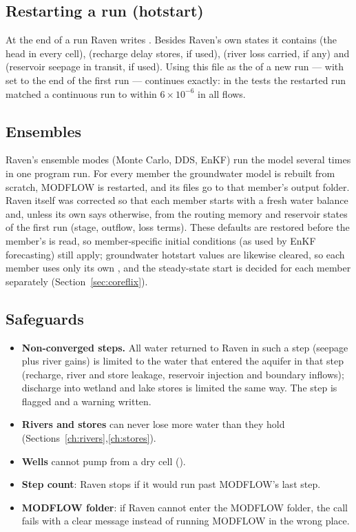 \subsection{Restarting a run (hotstart)}
At the end of a run Raven writes . Besides Raven's own states it contains  (the head in
every cell),  (recharge delay stores, if used),  (river loss carried, if any) and  (reservoir seepage in
transit, if used). Using this file as the  of a new run --- with  set to the end of the first
run --- continues exactly: in the tests the restarted run matched a continuous run to within $6\times10^{-6}$ in all flows.

\subsection{Ensembles}
Raven's ensemble modes (Monte Carlo, DDS, EnKF) run the model several times in one program run. For every member the
groundwater model is rebuilt from scratch, MODFLOW is restarted, and its files go to that member's output folder.
Raven itself was corrected so that each member starts with a fresh water balance and, unless its own  says
otherwise, from the routing memory and reservoir states of the first run (stage, outflow, loss terms). These defaults are
restored before the member's  is read, so member-specific initial conditions (as used by EnKF forecasting) still
apply; groundwater hotstart values are likewise cleared, so each member uses only its own , and the steady-state
start is decided for each member separately
(Section~\ref{sec:coreflix}).

\subsection{Safeguards}\label{sec:guard}
\begin{itemize}
\item \textbf{Non-converged steps.} All water returned to Raven in such a step (seepage plus river gains) is limited to
the water that entered the aquifer in that step (recharge, river and store leakage, reservoir injection and boundary
inflows); discharge into wetland and lake stores is limited the same way. The step is flagged and a warning written.
\item \textbf{Rivers and stores} can never lose more water than they hold (Sections~\ref{ch:rivers},\ref{ch:stores}).
\item \textbf{Wells} cannot pump from a dry cell ().
\item \textbf{Step count}: Raven stops if it would run past MODFLOW's last step.
\item \textbf{MODFLOW folder}: if Raven cannot enter the MODFLOW folder, the call fails with a clear message instead of
running MODFLOW in the wrong place.
\end{itemize}
